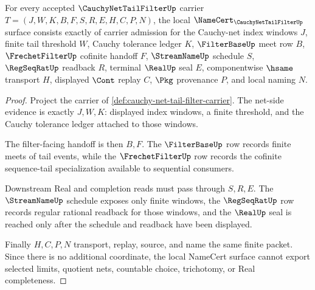 \begin{theorem}
\label{thm:cauchy-net-tail-filter-namecert-obligations}
For every accepted $\CauchyNetTailFilterUp$ carrier $T=(J,W,K,B,F,S,R,E,H,C,P,N)$, the local $\NameCert_{\CauchyNetTailFilterUp}$ surface consists exactly of carrier admission for the Cauchy-net index windows $J$, finite tail threshold $W$, Cauchy tolerance ledger $K$, $\FilterBaseUp$ meet row $B$, $\FrechetFilterUp$ cofinite handoff $F$, $\StreamNameUp$ schedule $S$, $\RegSeqRatUp$ readback $R$, terminal $\RealUp$ seal $E$, componentwise $\hsame$ transport $H$, displayed $\Cont$ replay $C$, $\Pkg$ provenance $P$, and local naming $N$.
\end{theorem}
\begin{proof}
Project the carrier of \autoref{def:cauchy-net-tail-filter-carrier}. The net-side evidence is exactly $J,W,K$: displayed index windows, a finite threshold, and the Cauchy tolerance ledger attached to those windows.

The filter-facing handoff is then $B,F$. The $\FilterBaseUp$ row records finite meets of tail events, while the $\FrechetFilterUp$ row records the cofinite sequence-tail specialization available to sequential consumers.

Downstream Real and completion reads must pass through $S,R,E$. The $\StreamNameUp$ schedule exposes only finite windows, the $\RegSeqRatUp$ row records regular rational readback for those windows, and the $\RealUp$ seal is reached only after the schedule and readback have been displayed.

Finally $H,C,P,N$ transport, replay, source, and name the same finite packet. Since there is no additional coordinate, the local NameCert surface cannot export selected limits, quotient nets, countable choice, trichotomy, or Real completeness.
\end{proof}



